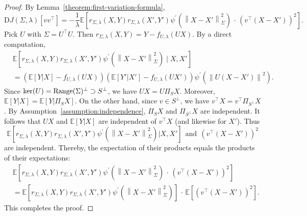 \documentclass[sn-mathphys-num]{sn-jnl}%
\numberwithin{equation}{section}
\newcommand{\E}{\mathbb{E}}
\newcommand{\norm}[1]{\left\|{#1}\right\|} %
\newcommand{\Range}{{\rm Range}}
\theoremstyle{thmstyleone}%
\theoremstyle{thmstyletwo}%
\theoremstyle{thmstylethree}%
\begin{document}
\begin{proof} 
By Lemma~\ref{theorem:first-variation-formula}, 
\begin{equation*}
	\mathrm{D} J(\Sigma, \lambda)[vv^\top]  =  -\frac{1}{\lambda} 
		\E \left[r_{\Sigma, \lambda}(X, Y) r_{\Sigma, \lambda}(X', Y')  \psi^\prime(\norm{X-X'}_{\Sigma}^2)\, \cdot \, (v^\top (X-X'))^2\right].
\end{equation*} 
Pick $U$ with $\Sigma = U^\top U$. Then $r_{\Sigma, \lambda}(X, Y) = Y - f_{U, \lambda}(U X)$. 
By a direct computation,
\begin{equation*}
\begin{split} 
	&\E[r_{\Sigma, \lambda}(X, Y) r_{\Sigma, \lambda}(X', Y')  \psi^\prime(\norm{X-X'}_{\Sigma}^2)\mid X, X'] \\
	&= (\E[Y|X] - f_{U, \lambda}(U X)) (\E[Y'|X'] - f_{U, \lambda}(U X'))  \psi^\prime(\norm{U (X-X')}^2).
\end{split} 
\end{equation*} 
Since $\ker(U) = \Range(\Sigma)^\perp \supset S^\perp$, we have $UX = U\Pi_S X$. 
Moreover, $\E[Y | X] = \E[Y | \Pi_S X]$.  On the other hand, since $v \in S^\perp$, we have 
$v^\top X = v^\top\Pi_{S^\perp}X$. By Assumption~\ref{assumption:independence},  $\Pi_S X$ and $\Pi_{S^\perp} X$ are independent. 
It follows that $UX$ and $\E[Y | X]$ are independent of $v^\top X$ (and
likewise for $X'$). Thus
\begin{equation*}
	\E[r_{\Sigma, \lambda}(X, Y) r_{\Sigma, \lambda}(X', Y')  \psi^\prime(\norm{X-X'}_{\Sigma}^2)| X, X']
	~~\text{and}~~(v^\top(X-X'))^2
\end{equation*} 
are independent. Thereby, the expectation of their products equals the products of their expectations: 
\begin{equation*}
\begin{split}  
		& \E \left[r_{\Sigma, \lambda}(X, Y) r_{\Sigma, \lambda}(X', Y')  \psi^\prime(\norm{X-X'}_{\Sigma}^2)\, \cdot \, (v^\top (X-X'))^2\right] \\
		&= \E \left[r_{\Sigma, \lambda}(X, Y) r_{\Sigma, \lambda}(X', Y')  \psi^\prime(\norm{X-X'}_{\Sigma}^2)\right] \, \cdot \, \E\left[ (v^\top (X-X'))^2\right].
\end{split} 
\end{equation*}
This completes the proof. 
\end{proof} 
\end{document}
